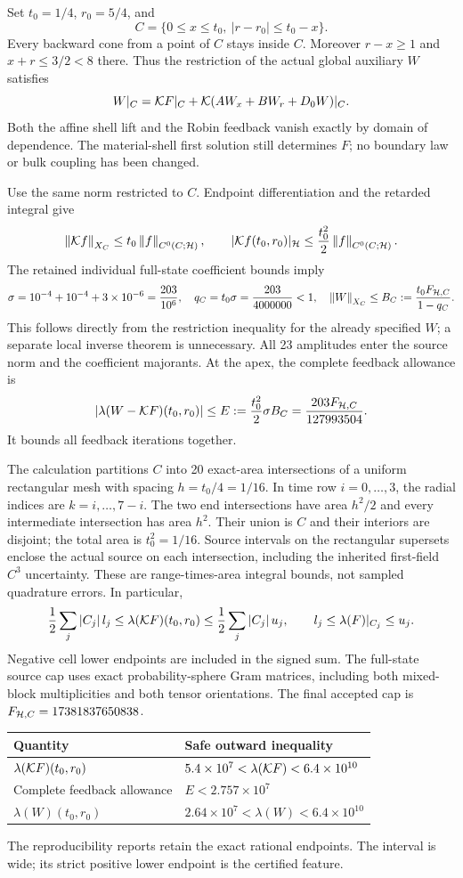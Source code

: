 Set $t_0=1/4$, $r_0=5/4$, and
\[
 C=\{0\le x\le t_0,\ |r-r_0|\le t_0-x\}.
\]
Every backward cone from a point of $C$ stays inside $C$. Moreover
$r-x\ge1$ and $x+r\le3/2<8$ there. Thus the restriction of the actual
global auxiliary $W$ satisfies
\[
 W|_C=\mathcal K F|_C+\mathcal K(AW_x+BW_r+D_0W)|_C.
\]
Both the affine shell lift and the Robin feedback vanish exactly by domain
of dependence. The material-shell first solution still determines $F$;
no boundary law or bulk coupling has been changed.

Use the same norm restricted to $C$. Endpoint differentiation and the
retarded integral give
\[
 \left\lVert\mathcal K f\right\rVert_{X_C}\le t_0\left\lVert f\right\rVert_{C^0(C;\mathcal H)},\qquad
 |\mathcal K f(t_0,r_0)|_{\mathcal H}\le\frac{t_0^2}{2}\left\lVert f\right\rVert_{C^0(C;\mathcal H)}.
\]
The retained individual full-state coefficient bounds imply
\[
 \sigma=10^{-4}+10^{-4}+3\times10^{-6}=\frac{203}{10^6},
 \quad q_C=t_0\sigma=\frac{203}{4000000}<1,
 \quad\left\lVert W\right\rVert_{X_C}\le B_C:=\frac{t_0F_{\mathcal H,C}}{1-q_C}.
\]
This follows directly from the restriction inequality for the already
specified $W$; a separate local inverse theorem is unnecessary. All 23
amplitudes enter the source norm and the coefficient majorants. At the apex,
the complete feedback allowance is
\[
 |\lambda(W-\mathcal K F)(t_0,r_0)|\le
 E:=\frac{t_0^2}{2}\sigma B_C
   =\frac{203F_{\mathcal H,C}}{127993504}.
\]
It bounds all feedback iterations together.

The calculation partitions $C$ into 20 exact-area intersections of a
uniform rectangular mesh with spacing $h=t_0/4=1/16$. In time row
$i=0,\ldots,3$, the radial indices are $k=i,\ldots,7-i$. The two end
intersections have area $h^2/2$ and every intermediate intersection has
area $h^2$. Their union is $C$ and their interiors are disjoint; the total
area is $t_0^2=1/16$. Source intervals on the rectangular supersets enclose
the actual source on each intersection, including the inherited first-field
$C^3$ uncertainty. These are range-times-area integral bounds, not sampled
quadrature errors. In particular,
\[
 \frac12\sum_j |C_j|\,l_j
 \le\lambda(\mathcal K F)(t_0,r_0)
 \le\frac12\sum_j |C_j|\,u_j,
 \qquad l_j\le\lambda(F)|_{C_j}\le u_j.
\]
Negative cell lower endpoints are included in the signed sum.
The full-state source cap uses exact probability-sphere Gram matrices,
including both mixed-block multiplicities and both tensor orientations.
The final accepted cap is $F_{\mathcal H,C}=17381837650838$.

\begin{center}
\begin{tabular}{ll}
\toprule
Quantity & Safe outward inequality\\
\midrule
$\lambda(\mathcal K F)(t_0,r_0)$ & $5.4\times10^7<\lambda(\mathcal K F)<6.4\times10^{10}$\\
Complete feedback allowance & $E<2.757\times10^7$\\
$\lambda(W)(t_0,r_0)$ & $2.64\times10^7<\lambda(W)<6.4\times10^{10}$\\
\bottomrule
\end{tabular}
\end{center}
The reproducibility reports retain the exact rational endpoints. The interval
is wide; its strict positive lower endpoint is the certified feature.

